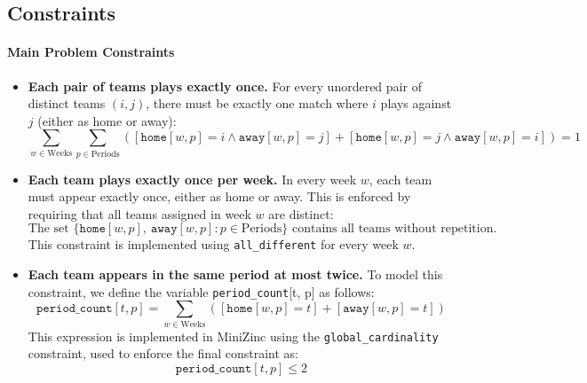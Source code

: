 \documentclass[11pt]{article}
\begin{document}
\subsection{Constraints}

\paragraph{Main Problem Constraints}

\begin{itemize} 
    \item \textbf{Each pair of teams plays exactly once.}  
    For every unordered pair of distinct teams $(i, j)$, there must be exactly one match where $i$ plays against $j$ (either as home or away):
    \begin{equation*}
        \sum_{w \in \text{Weeks}} \sum_{p \in \text{Periods}} \left( [\texttt{home}[w,p] = i \land \texttt{away}[w,p] = j] + [\texttt{home}[w,p] = j \land \texttt{away}[w,p] = i] \right) = 1
    \end{equation*}

    \item \textbf{Each team plays exactly once per week.}  
    In every week $w$, each team must appear exactly once, either as home or away. This is enforced by requiring that all teams assigned in week $w$ are distinct:
    \begin{equation*}
        \text{The set } \{\texttt{home}[w,p],\ \texttt{away}[w,p] : p \in \text{Periods}\} \text{ contains all teams without repetition.}
    \end{equation*}
    This constraint is implemented using \texttt{all\_different} for every week $w$.

    \item \textbf{Each team appears in the same period at most twice.}  
    To model this constraint, we define the variable \texttt{period\_count}[t, p] as follows:
    \begin{equation*}
        \texttt{period\_count}[t, p] = \sum_{w \in \text{Weeks}} \left( [\texttt{home}[w,p] = t] + [\texttt{away}[w,p] = t] \right)
    \end{equation*}
    This expression is implemented in MiniZinc using the \texttt{global\_cardinality} constraint, used to enforce the final constraint as:
    \begin{equation*}
        \texttt{period\_count}[t, p] \leq 2
    \end{equation*}
\end{itemize}
\end{document}
